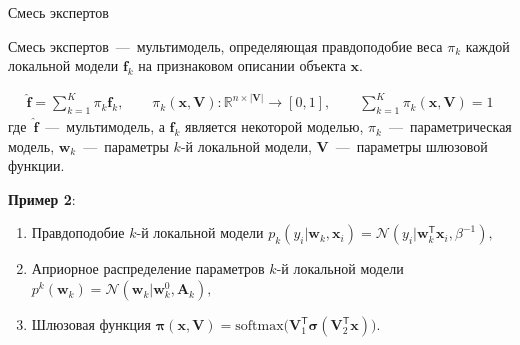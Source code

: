 \documentclass[9pt,pdf,hyperref={unicode}]{beamer}
\begin{document}
\begin{frame}{Смесь экспертов}
\justifying
\begin{definition}
\label{sl:5:eq:1}
Смесь экспертов~---~мультимодель, определяющая правдоподобие веса $\pi_k$ каждой локальной модели $\textbf{f}_k$ на признаковом описании объекта $\textbf{x}$.

\begin{equation}
\label{sl:5:eq:2}
\begin{aligned}
\hat{\mathbf{f}} = \sum_{k=1}^{K}\pi_{k}\mathbf{f}_k, \qquad \pi_{k}\left(\mathbf{x}, \mathbf{V}\right):\mathbb{R}^{n\times \left|\mathbf{V}\right|} \to [0, 1], \qquad \sum_{k=1}^{K}\pi_{k}\left(\mathbf{x}, \mathbf{V}\right) = 1
\end{aligned}
\end{equation}
где~$\hat{\mathbf{f}}$~---~мультимодель, а $\mathbf{f}_k$ является некоторой моделью, $\pi_k$~---~параметрическая модель, $\mathbf{w}_k$~---~параметры $k$-й локальной модели, $\mathbf{V}$~---~параметры шлюзовой функции.
\end{definition}
{\bf Пример 2}:
	\begin{enumerate}
		\item Правдоподобие $k$-й локальной модели $p_{k}\left(y_{i}|\mathbf{w}_{k}, \mathbf{x}_{i}\right) = \mathcal{N}\left(y_{i}|\mathbf{w}_{k}^{\mathsf{T}}\mathbf{x}_{i}, \beta^{-1}\right),$
		\item Априорное распределение параметров $k$-й локальной модели $p^{k}\left(\mathbf{w}_{k}\right) = \mathcal{N}\left(\mathbf{w}_{k}|\mathbf{w}^{0}_{k}, \mathbf{A}_{k}\right),$
		\item Шлюзовая функция $\bm{\pi}\left(\mathbf{x}, \mathbf{V}\right) = \text{softmax}\bigr(\mathbf{V}_{1}^{\mathsf{T}}\bm{\sigma}\left(\mathbf{V}_2^{\mathsf{T}}\mathbf{x}\right)\bigr).$
	\end{enumerate}
\end{frame}
\end{document}
